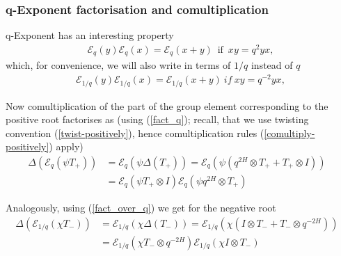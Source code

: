 \documentclass{article}
\newcommand{\lb}{\left (}
\newcommand{\rb}{\right )}
\newcommand{\lsb}{\left [}
\newcommand{\rsb}{\right ]}
\newcommand{\be}{\begin{eqnarray}}
\newcommand{\ee}{\end{eqnarray}}
\DeclareMathOperator{\If}{if}
\newcommand {\?}{\textit{???}}
\newcommand{\me}[0]{\mathcal{E}}
\def\dg{\Delta (g)}
\def\gog{g \otimes g}
\newcommand{\comul}[1]{\Delta \lb #1 \rb}
\newcommand{\delabel}[1]{(\ref{#1})}
\begin{document}



\subsubsection{q-Exponent factorisation and comultiplication}
q-Exponent has an interesting property
\be
\me_q(y)\me_q(x) = \me_q(x + y)\ \If \ xy = q^2 yx, \label{fact_q}
\ee
which, for convenience, we will also write in terms of $1/q$ instead of $q$
\be
\me_{1/q}(y)\me_{1/q}(x) = \me_{1/q}(x + y)\ if\ xy = q^{-2} yx, \label{fact_over_q}
\ee

Now comultiplication of the part of the group element corresponding to the positive root factorises as
(using \delabel{fact_q}; recall, that we use twisting convention \delabel{twist-positively}, hence
comultiplication rules \delabel{comultiply-positively} apply)
\be
\label{comul-expt-positive-sl2}
\comul{\me_q \lb \psi T_+ \rb} & = \me_q \lb \psi \comul{T_+}\rb = \me_q \lb \psi \lb q^{2H} \otimes T_+ + T_+ \otimes I \rb \rb & \\
& = \me_q \lb \psi T_+ \otimes I\rb \me_q \lb \psi q^{2H} \otimes T_+\rb \nonumber
\ee

Analogously, using (\ref{fact_over_q}) we get for the negative root
\be
\label{comul-expt-negative-sl2}
\comul{\me_{1/q} \lb \chi T_- \rb} & = \me_{1/q} \lb \chi \comul{T_-}\rb = \me_{1/q} \lb \chi \lb I \otimes T_- + T_- \otimes q^{-2H} \rb \rb & \\
& = \me_{1/q} \lb \chi T_- \otimes q^{-2H}\rb \me_{1/q} \lb \chi I \otimes T_-\rb \nonumber
\ee
\end{document}
